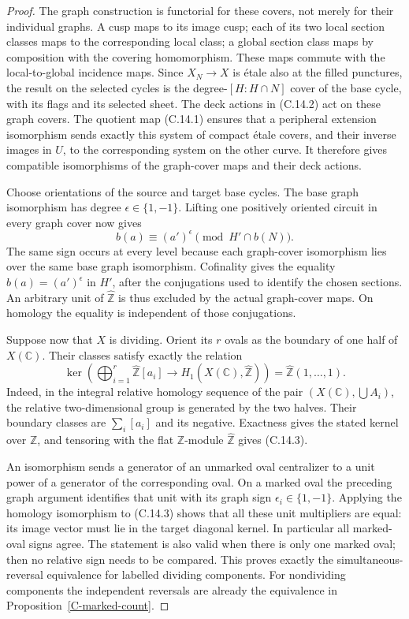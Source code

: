 \documentclass[11pt,oneside]{article}
\begin{document}
\begin{proof}
The graph construction is functorial for these covers, not merely
for their individual graphs. A cusp maps to its image cusp; each
of its two local section classes maps to the corresponding local
class; a global section class maps by composition with the covering
homomorphism. These maps commute with the local-to-global incidence
maps. Since $X_N\to X$ is \'etale also at the filled punctures,
the result on the selected cycles is the degree-$[H:H\cap N]$
cover of the base cycle, with its flags and its selected sheet.
The deck actions in (C.14.2) act on these graph covers. The quotient
map (C.14.1) ensures that a peripheral extension isomorphism sends
exactly this system of compact \'etale covers, and their inverse
images in $U$, to the corresponding system on the other curve.
It therefore gives compatible isomorphisms of the graph-cover
maps and their deck actions.

Choose orientations of the source and target base cycles. The
base graph isomorphism has degree $\epsilon\in\{1,-1\}$. Lifting
one positively oriented circuit in every graph cover now gives
\[
 b(a)\equiv (a')^{\epsilon}\pmod {H'\cap b(N)}.
\]
The same sign occurs at every level because each graph-cover
isomorphism lies over the same base graph isomorphism. Cofinality
gives the equality $b(a)=(a')^{\epsilon}$ in $H'$, after the
conjugations used to identify the chosen sections. An arbitrary
unit of $\widehat{\mathbb Z}$ is thus excluded by the actual
graph-cover maps. On homology the equality is independent of
those conjugations.

Suppose now that $X$ is dividing. Orient its $r$ ovals as the
boundary of one half of $X(\mathbb C)$. Their classes satisfy
exactly the relation
\[
 \ker\left(\bigoplus_{i=1}^r\widehat{\mathbb Z}[a_i]
      \longrightarrow H_1(X(\mathbb C),\widehat{\mathbb Z})\right)
     =\widehat{\mathbb Z}(1,\ldots,1).
\tag{C.14.3}
\]
Indeed, in the integral relative homology sequence of the pair
$(X(\mathbb C),\bigcup A_i)$, the relative two-dimensional group
is generated by the two halves. Their boundary classes are
$\sum_i[a_i]$ and its negative. Exactness gives the stated
kernel over $\mathbb Z$, and tensoring with the flat
$\mathbb Z$-module $\widehat{\mathbb Z}$ gives (C.14.3).

An isomorphism sends a generator of an unmarked oval centralizer
to a unit power of a generator of the corresponding oval. On a
marked oval the preceding graph argument identifies that unit
with its graph sign $\epsilon_i\in\{1,-1\}$. Applying the
homology isomorphism to (C.14.3) shows that all these unit
multipliers are equal: its image vector must lie in the target
diagonal kernel. In particular all marked-oval signs agree.
The statement is also valid when there is only one marked oval;
then no relative sign needs to be compared. This proves exactly
the simultaneous-reversal equivalence for labelled dividing
components. For nondividing components the independent reversals
are already the equivalence in
Proposition~\ref{C-marked-count}.


\end{proof}
\end{document}
